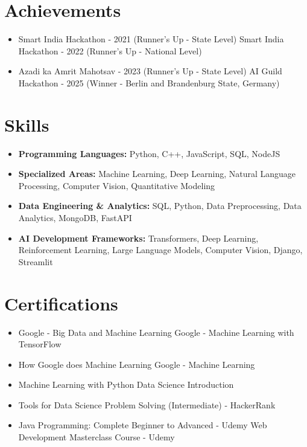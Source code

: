 \documentclass[a4paper,10pt]{article}
\begin{document}
\section*{Achievements}
\begin{itemize}
\item Smart India Hackathon - 2021 (Runner's Up - State Level) \hfill Smart India Hackathon - 2022 (Runner's Up - National Level)
\item Azadi ka Amrit Mahotsav - 2023 (Runner's Up - State Level) \hfill AI Guild Hackathon - 2025 (Winner - Berlin and Brandenburg State, Germany)
\end{itemize}

\section*{Skills}
\begin{itemize}
  \item \textbf{Programming Languages:} Python, C++, JavaScript, SQL, NodeJS
  \item \textbf{Specialized Areas:} Machine Learning, Deep Learning, Natural Language Processing, Computer Vision, Quantitative Modeling
  \item \textbf{Data Engineering \& Analytics:} SQL, Python, Data Preprocessing, Data Analytics, MongoDB, FastAPI
  \item \textbf{AI Development Frameworks:} Transformers, Deep Learning, Reinforcement Learning, Large Language Models, Computer Vision, Django, Streamlit
\end{itemize}

\section*{Certifications}
\begin{itemize}
\item Google - Big Data and Machine Learning \hfill Google - Machine Learning with TensorFlow
\item How Google does Machine Learning \hfill Google - Machine Learning
\item Machine Learning with Python \hfill Data Science Introduction
\item Tools for Data Science \hfill Problem Solving (Intermediate) - HackerRank
\item Java Programming: Complete Beginner to Advanced - Udemy \hfill Web Development Masterclass Course - Udemy
\end{itemize}
\end{document}
